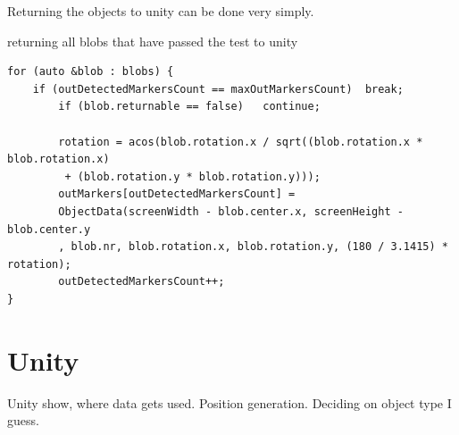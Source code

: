 Returning the objects to unity can be done very simply. 
 \begin{listing}[H]
	\caption{returning all blobs that have passed the test to unity}
	\begin{verbatim}
for (auto &blob : blobs) {
	if (outDetectedMarkersCount == maxOutMarkersCount)	break;
		if (blob.returnable == false)	continue;
		
		rotation = acos(blob.rotation.x / sqrt((blob.rotation.x * blob.rotation.x)
		 + (blob.rotation.y * blob.rotation.y)));
		outMarkers[outDetectedMarkersCount] = 
		ObjectData(screenWidth - blob.center.x, screenHeight - blob.center.y
		, blob.nr, blob.rotation.x, blob.rotation.y, (180 / 3.1415) * rotation);
		outDetectedMarkersCount++;
}
	\end{verbatim}
	\label{listing:return}
\end{listing}
\section{Unity}
	Unity show, where data gets used.
	Position generation.
	Deciding on object type I guess.
	
